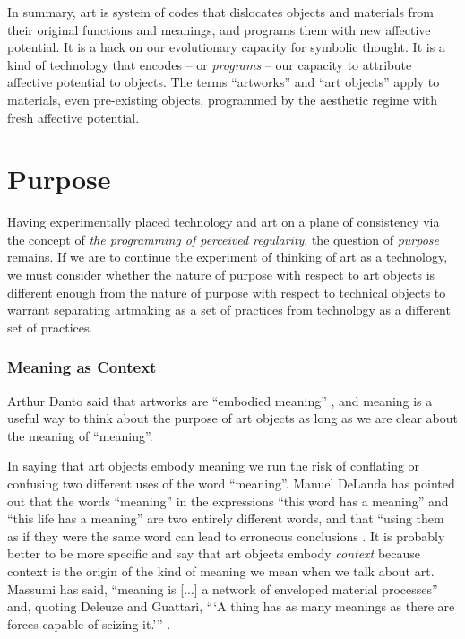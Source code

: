 \documentclass[letterpaper]{article}
\begin{document}
    In summary, art is system of codes that dislocates objects and materials from their original functions and meanings, and programs them with new affective potential. It is a hack on our evolutionary capacity for symbolic thought. It is a kind of technology that encodes – or \emph{programs} – our capacity to attribute affective potential to objects. The terms “artworks” and “art objects” apply to materials, even pre-existing objects, programmed by the aesthetic regime with fresh affective potential.
    
\section{Purpose}

    Having experimentally placed technology and art on a plane of consistency via the concept of \emph{the programming of perceived regularity}, the question of \emph{purpose} remains. If we are to continue the experiment of thinking of art as a technology, we must consider whether the nature of purpose with respect to art objects is different enough from the nature of purpose with respect to technical objects to warrant separating artmaking as a set of practices from technology as a different set of practices.
    
    \subsubsection{Meaning as Context}

    Arthur Danto said that artworks are “embodied meaning” \citep[p.125]{DantoEmbdMnngs2007}, and meaning is a useful way to think about the purpose of art objects as long as we are clear about the meaning of “meaning”.
    
    In saying that art objects embody meaning we run the risk of conflating or confusing two different uses of the word “meaning”. Manuel DeLanda has pointed out that the words “meaning” in the expressions “this word has a meaning” and “this life has a meaning” are two entirely different words, and that “using them as if they were the same word can lead to erroneous conclusions \citep[pp.40-41]{DeLandaCsltyAndMnng2018}. It is probably better to be more specific and say that art objects embody \emph{context} because context is the origin of the kind of meaning we mean when we talk about art. Massumi has said, “meaning is [...] a network of enveloped material processes” and, quoting Deleuze and Guattari, “‘A thing has as many meanings as there are forces capable of seizing it.’” \citep[p.10]{MassumiAUsrsGdTCptlsmAndSchzphrn1992}.
\end{document}
